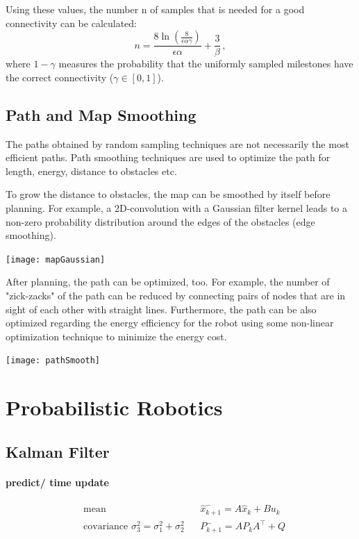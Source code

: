 \begin{multicols*}{2}
Using these values, the number n of samples that is needed for a good connectivity can be calculated:
\[ n= \frac{8 \ln (\frac{8}{\epsilon\alpha\gamma})}{\epsilon\alpha} + \frac{3}{\beta} \,, \] 
where $1-\gamma$ measures the probability that the uniformly sampled milestones have the correct connectivity ($\gamma \in [0,1]$).

\subsection{Path and Map Smoothing}
The paths obtained by random sampling techniques are not necessarily the most efficient paths. Path smoothing techniques are used to optimize the path for length, energy, distance to obstacles etc. 

To grow the distance to obstacles, the map can be smoothed by itself before planning. For example, a 2D-convolution with a Gaussian filter kernel leads to a non-zero probability distribution around the edges of the obstacles (edge smoothing).

\texttt{[image: mapGaussian]}
 
After planning, the path can be optimized, too. For example, the number of "zick-zacks" of the path can be reduced by connecting pairs of nodes that are in sight of each other with straight lines. Furthermore, the path can be also optimized regarding the energy efficiency for the robot using some non-linear optimization technique to minimize the energy cost.

\texttt{[image: pathSmooth]}

\section{Probabilistic Robotics}

\subsection{Kalman Filter}

\paragraph{predict/ time update}

\begin{align}
	&\text{mean} && \hat{x}_{k+1}^- = A \hat{x}_{k} + B u_k  \\
	&\text{covariance } \sigma_3^2 = \sigma_1^2 + \sigma_2^2 && P_{k+1}^- = A P_k A^\top + Q 
\end{align}


\end{multicols*}
